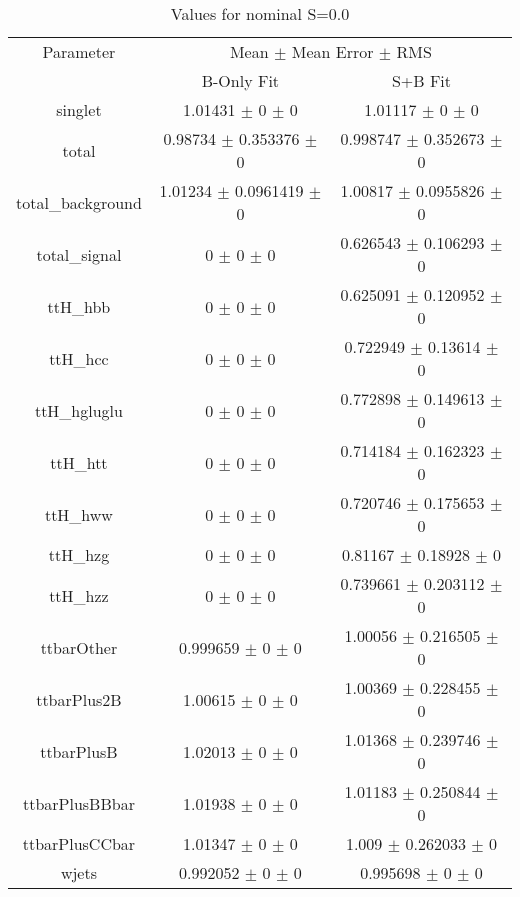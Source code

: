 \begin{table}
\centering
\caption{Values for nominal S=0.0}
\begin{tabular}{ccc}
\toprule
Parameter & \multicolumn{2}{c}{Mean $\pm$ Mean Error $\pm$ RMS}\\
 & B-Only Fit & S+B Fit\\
\midrule
singlet & \num{1.01431} $\pm$ \num{0} $\pm$ \num{0} & \num{1.01117} $\pm$ \num{0} $\pm$ \num{0}\\
total & \num{0.98734} $\pm$ \num{0.353376} $\pm$ \num{0} & \num{0.998747} $\pm$ \num{0.352673} $\pm$ \num{0}\\
total\_background & \num{1.01234} $\pm$ \num{0.0961419} $\pm$ \num{0} & \num{1.00817} $\pm$ \num{0.0955826} $\pm$ \num{0}\\
total\_signal & \num{0} $\pm$ \num{0} $\pm$ \num{0} & \num{0.626543} $\pm$ \num{0.106293} $\pm$ \num{0}\\
ttH\_hbb & \num{0} $\pm$ \num{0} $\pm$ \num{0} & \num{0.625091} $\pm$ \num{0.120952} $\pm$ \num{0}\\
ttH\_hcc & \num{0} $\pm$ \num{0} $\pm$ \num{0} & \num{0.722949} $\pm$ \num{0.13614} $\pm$ \num{0}\\
ttH\_hgluglu & \num{0} $\pm$ \num{0} $\pm$ \num{0} & \num{0.772898} $\pm$ \num{0.149613} $\pm$ \num{0}\\
ttH\_htt & \num{0} $\pm$ \num{0} $\pm$ \num{0} & \num{0.714184} $\pm$ \num{0.162323} $\pm$ \num{0}\\
ttH\_hww & \num{0} $\pm$ \num{0} $\pm$ \num{0} & \num{0.720746} $\pm$ \num{0.175653} $\pm$ \num{0}\\
ttH\_hzg & \num{0} $\pm$ \num{0} $\pm$ \num{0} & \num{0.81167} $\pm$ \num{0.18928} $\pm$ \num{0}\\
ttH\_hzz & \num{0} $\pm$ \num{0} $\pm$ \num{0} & \num{0.739661} $\pm$ \num{0.203112} $\pm$ \num{0}\\
ttbarOther & \num{0.999659} $\pm$ \num{0} $\pm$ \num{0} & \num{1.00056} $\pm$ \num{0.216505} $\pm$ \num{0}\\
ttbarPlus2B & \num{1.00615} $\pm$ \num{0} $\pm$ \num{0} & \num{1.00369} $\pm$ \num{0.228455} $\pm$ \num{0}\\
ttbarPlusB & \num{1.02013} $\pm$ \num{0} $\pm$ \num{0} & \num{1.01368} $\pm$ \num{0.239746} $\pm$ \num{0}\\
ttbarPlusBBbar & \num{1.01938} $\pm$ \num{0} $\pm$ \num{0} & \num{1.01183} $\pm$ \num{0.250844} $\pm$ \num{0}\\
ttbarPlusCCbar & \num{1.01347} $\pm$ \num{0} $\pm$ \num{0} & \num{1.009} $\pm$ \num{0.262033} $\pm$ \num{0}\\
wjets & \num{0.992052} $\pm$ \num{0} $\pm$ \num{0} & \num{0.995698} $\pm$ \num{0} $\pm$ \num{0}\\
\bottomrule
\end{tabular}
\end{table}